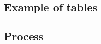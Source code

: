 \documentclass[nojss]{jss}\usepackage[]{graphicx}\usepackage[]{color}
\begin{document}
\subsection{Example of tables}





\subsection{Process}
\end{document}
